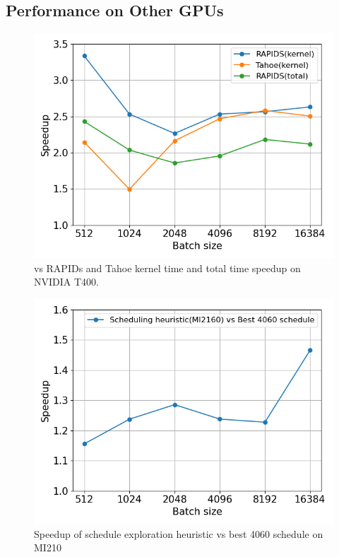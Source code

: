 
\subsection{Performance on Other GPUs}
\begin{figure}[htb]
  \centering
  \includegraphics[width=0.75\linewidth]{figures/geomean_speedup_T400_kernel_time.png}
  \caption{\Treebeard{} vs RAPIDs and Tahoe kernel time and total time speedup on NVIDIA T400.}
  \label{Fig:TBvsRAPIDsTahoe_T400_Speedup}
\end{figure}

\begin{figure}[htb]
  \centering
  \includegraphics[width=0.75\linewidth]{figures/geomean_speedup_AMDMI2160_4060_vs_MI2160.png}
  \caption{Speedup of schedule exploration heuristic vs best 4060 schedule on MI210}
  \label{Fig:AMD_MI210_ATHeuristicVs4060Sched_speedup}
\end{figure}


